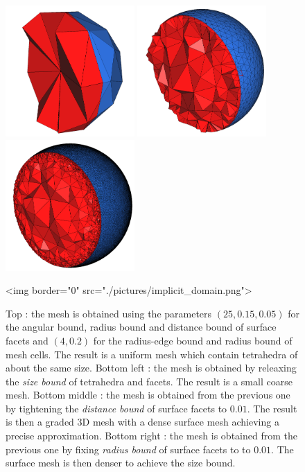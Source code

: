 \begin{figure}[ht]
\begin{center}
\begin{ccTexOnly}
   \includegraphics[height=5cm]{Mesh_3/pictures/implicit_domain_3}
   \includegraphics[height=5cm]{Mesh_3/pictures/implicit_domain_4}
   \includegraphics[height=5cm]{Mesh_3/pictures/implicit_domain_5}
 \end{ccTexOnly}
 \begin{ccHtmlOnly}
   <img border="0" src="./pictures/implicit_domain.png">
 \end{ccHtmlOnly}
 \caption{Top : the mesh  is obtained using the parameters $(25,0.15,0.05)$ for the angular bound,
radius bound and distance bound of  surface facets
and 
$(4,0.2)$ for  the radius-edge bound and radius  bound of mesh cells. The result is a  uniform mesh which contain tetrahedra
of about the same size. 
Bottom  left :
the mesh  is obtained by releaxing the \emph{ size bound} of tetrahedra
and facets.
 The result is a small coarse mesh. 
Bottom middle : the mesh  is obtained from the previous one  by tightening the \emph{distance bound} 
of surface facets to
$0.01$. The result is then a graded 3D mesh with a dense surface mesh
achieving a precise approximation. 
Bottom right :
the mesh  is obtained from the previous one  by fixing \emph{radius bound} of surface facets to
to $0.01$. The surface mesh is then denser to achieve the size bound.}
  \label{figure:parameters}
\end{center}
\end{figure}



